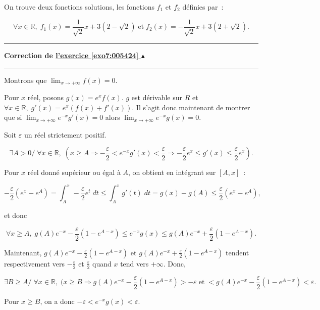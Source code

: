 \documentclass[11pt,a4paper]{article}
\newcommand{\Rr}{\mathbb{R}} \newcommand{\R}{\mathbb{R}}
\newcounter{exo}
\newcommand{\correction}[1]{\hypertarget{cor7:#1}{}\label{cor7:#1}{\bf Correction de \hyperlink{exo7:#1}{l'exercice \ref{exo7:#1} $\blacktriangle$}}\vspace{1mm}\hrule\vspace{1mm}}
\newcommand{\fincorrection}{\vspace{1mm}\hrule\vspace*{7mm}}
\begin{document}
On trouve deux fonctions solutions, les fonctions $f_1$ et $f_2$ définies par~:

$$\forall x\in\Rr,\;f_1(x)=\frac{1}{\sqrt{2}}x+3(2-\sqrt{2})\;\mbox{et}\;f_2(x)=-\frac{1}{\sqrt{2}}x+3(2+\sqrt{2}).$$

\fincorrection
\correction{005424}
Montrons que $\lim_{x\rightarrow +\infty}f(x)=0$.

Pour $x$ réel, posons $g(x)=e^xf(x)$. $g$ est dérivable sur $R$ et $\forall x\in\Rr,\;g'(x)=e^x(f(x)+f'(x))$. Il s'agit donc maintenant de montrer que si $\lim_{x\rightarrow +\infty}e^{-x}g'(x)=0$ alors $\lim_{x\rightarrow +\infty}e^{-x}g(x)=0$.

Soit $\varepsilon$ un réel strictement positif.

$$\exists A>0/\;\forall x\in\Rr,\;(x\geq A\Rightarrow-\frac{\varepsilon}{2}<e^{-x}g'(x)<\frac{\varepsilon}{2}\Rightarrow-\frac{\varepsilon}{2}e^x\leq g'(x)\leq \frac{\varepsilon}{2}e^x).$$
 
Pour $x$ réel donné supérieur ou égal à $A$, on obtient en intégrant sur $[A,x]$~:

$$-\frac{\varepsilon}{2}(e^x-e^A)=\int_{A}^{x}-\frac{\varepsilon}{2}e^t\;dt\leq\int_{A}^{x}g'(t)\;dt=g(x)-g(A)\leq
\frac{\varepsilon}{2}(e^x-e^A),$$

et donc 

$$\forall x\geq A,\;g(A)e^{-x}-\frac{\varepsilon}{2}(1-e^{A-x})\leq e^{-x}g(x)\leq g(A)e^{-x}+\frac{\varepsilon}{2}(1-e^{A-x}).$$

Maintenant, $g(A)e^{-x}-\frac{\varepsilon}{2}(1-e^{A-x})$ et $g(A)e^{-x}+\frac{\varepsilon}{2}(1-e^{A-x})$ tendent respectivement vers $-\frac{\varepsilon}{2}$ et $\frac{\varepsilon}{2}$ quand $x$ tend vers $+\infty$. Donc,

$$\exists B\geq A/\;\forall x\in\Rr,\;(x\geq B\Rightarrow g(A)e^{-x}-\frac{\varepsilon}{2}(1-e^{A-x})>-\varepsilon\;\mbox{et}\;<g(A)e^{-x}-\frac{\varepsilon}{2}(1-e^{A-x})
<\varepsilon.$$

Pour $x\geq B$, on a donc $-\varepsilon<e^{-x}g(x)<\varepsilon$.
\end{document}
